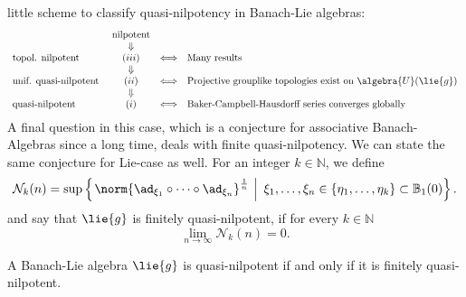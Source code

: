 \documentclass[
11pt,                          %
english                        %
]{article}
\begin{document}
little scheme to classify quasi-nilpotency in Banach-Lie algebras:
\begin{equation}
	\label{classification}
	\begin{array}{lccl}
		& \text{nilpotent} &
		\\
		& \Downarrow &
		\\
		\text{topol. nilpotent } &
		(iii) & \Longleftrightarrow &
		\text{Many results}
		\\
		& \Downarrow &
		\\
		\text{unif. quasi-nilpotent } &
		(ii) & \Longleftrightarrow &
		\text{Projective grouplike topologies exist on }
		\algebra{U}(\lie{g})
		\\
		& \Downarrow &
		\\
		\text{quasi-nilpotent } &
		(i) & \Longleftrightarrow &
		\text{Baker-Campbell-Hausdorff series converges globally}
	\end{array}
\end{equation}
A final question in this case, which is a conjecture for associative Banach-Algebras 
since a long time, deals with finite quasi-nilpotency. We can state the same 
conjecture for Lie-case as well. For an integer $k \in \mathbb{N}$, we define
\begin{equation}
	\mathcal{N}_k(n)
	=
	\sup \left\{ 
	\left.
		\norm{ \ad_{\xi_1} \circ \cdots \circ \ad_{\xi_n} }^{\frac{1}{n}} 
	\ \right| \
		\xi_1, \ldots, \xi_n 
		\in 
		\{\eta_1, \ldots, \eta_k \}
		\subset 
		\mathbb{B}_1(0)
	\right\}.
\end{equation}
and say that $\lie{g}$ is finitely quasi-nilpotent, if for every $k \in \mathbb{N}$
\begin{equation}
	\lim\limits_{n \rightarrow \infty}
	\mathcal{N}_k(n)
	=
	0.
\end{equation}
\begin{conjecture}
	A Banach-Lie algebra $\lie{g}$ is quasi-nilpotent if and only if it is finitely 
	quasi-nilpotent.
\end{conjecture}
\end{document}

